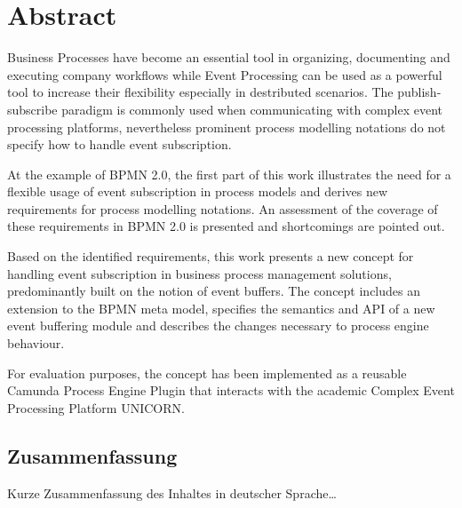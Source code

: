\begingroup
\let\clearpage\relax
\let\cleardoublepage\relax
\let\cleardoublepage\relax

\chapter*{Abstract}
Business Processes have become an essential tool in organizing, documenting and executing company workflows while Event Processing can be used as a powerful tool to increase their flexibility especially in destributed scenarios. 
The publish-subscribe paradigm is commonly used when communicating with complex event processing platforms, nevertheless prominent process modelling notations do not specify how to handle event subscription.

At the example of BPMN 2.0, the first part of this work illustrates the need for a flexible usage of event subscription in process models and derives new requirements for process modelling notations. An assessment of the coverage of these requirements in BPMN 2.0 is presented and shortcomings are pointed out.

Based on the identified requirements, this work presents a new concept for handling event subscription in business process management solutions, predominantly built on the notion of event buffers. The concept includes an extension to the BPMN meta model, specifies the semantics and API of a new event buffering module and describes the changes necessary to process engine behaviour.

For evaluation purposes, the concept has been implemented as a reusable Camunda Process Engine Plugin that interacts with the academic Complex Event Processing Platform UNICORN.


\vfill

\begin{otherlanguage}{ngerman}
\chapter*{Zusammenfassung}
Kurze Zusammenfassung des Inhaltes in deutscher Sprache\dots 
\end{otherlanguage}

\endgroup			

\vfill